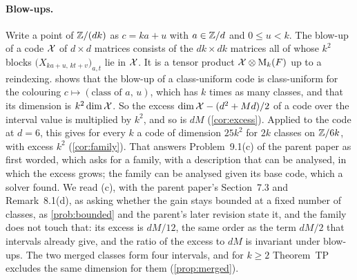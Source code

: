 \paragraph{Blow-ups.} Write a point of $\mathbb{Z}/(dk)$ as $c=ka+u$ with $a\in\mathbb{Z}/d$ and $0\le u<k$. The blow-up of a code
$\mathcal{X}$ of $d\times d$ matrices consists of the $dk\times dk$ matrices all of whose $k^2$ blocks
$\bigl(X_{ka+u,\,kt+v}\bigr)_{a,t}$ lie in $\mathcal{X}$. It is a tensor product $\mathcal{X}\otimes\mathrm{M}_k(F)$ up to a reindexing.
 shows that the blow-up of a class-uniform code is class-uniform for the colouring
$c\mapsto(\text{class of }a,\,u)$, which has $k$ times as many classes, and that its dimension is $k^2\dim\mathcal{X}$. So the
excess $\dim\mathcal{X}-(d^2+Md)/2$ of a code over the interval value is multiplied by $k^2$, and so is $dM$
(\cref{cor:excess}). Applied to the code at $d=6$, this gives for every $k$ a code of dimension $25k^2$ for $2k$
classes on $\mathbb{Z}/6k$, with excess $k^2$ (\cref{cor:family}). That answers Problem~9.1(c) of the parent paper as first worded,
which asks for a family, with a description that can be analysed, in which the excess grows; the family can be
analysed given its base code, which a solver found. We read (c), with the parent paper's Section~7.3 and
Remark~8.1(d), as asking whether the gain stays bounded at a fixed number of classes, as \cref{prob:bounded} and the
parent's later revision state it, and the family does not touch that: its excess is $dM/12$, the same order as the term $dM/2$ that intervals already give, and the ratio of the excess
to $dM$ is invariant under blow-ups. The two merged classes form four intervals, and for $k\ge2$ Theorem~TP excludes
the same dimension for them (\cref{prop:merged}).

